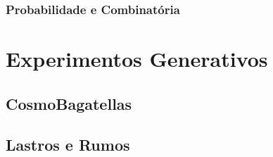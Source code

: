 \documentclass[
	12pt,				%
	openright,			%
	twoside,			%
	a4paper,			%
	english,			%
	french,				%
	spanish,			%
	brazil				%
	]{abntex2}
\begin{document}
\section{Probabilidade e Combinatória}




\part{Experimentos Generativos}

\chapter{CosmoBagatellas}


\chapter{Lastros e Rumos}







\postextual

%

%
%








\end{document}
